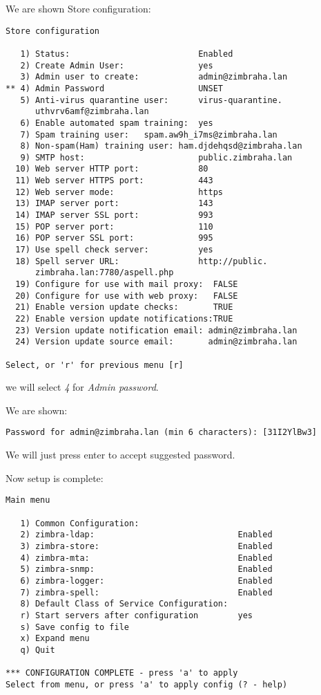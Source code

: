 We are shown Store configuration:
\begin{verbatim}
Store configuration

   1) Status:                          Enabled
   2) Create Admin User:               yes
   3) Admin user to create:            admin@zimbraha.lan
** 4) Admin Password                   UNSET
   5) Anti-virus quarantine user:      virus-quarantine.
      uthvrv6amf@zimbraha.lan
   6) Enable automated spam training:  yes 
   7) Spam training user:   spam.aw9h_i7ms@zimbraha.lan
   8) Non-spam(Ham) training user: ham.djdehqsd@zimbraha.lan
   9) SMTP host:                       public.zimbraha.lan
  10) Web server HTTP port:            80
  11) Web server HTTPS port:           443
  12) Web server mode:                 https
  13) IMAP server port:                143
  14) IMAP server SSL port:            993
  15) POP server port:                 110
  16) POP server SSL port:             995
  17) Use spell check server:          yes
  18) Spell server URL:                http://public.
      zimbraha.lan:7780/aspell.php
  19) Configure for use with mail proxy:  FALSE
  20) Configure for use with web proxy:   FALSE
  21) Enable version update checks:       TRUE
  22) Enable version update notifications:TRUE
  23) Version update notification email: admin@zimbraha.lan
  24) Version update source email:       admin@zimbraha.lan

Select, or 'r' for previous menu [r]
\end{verbatim}
we will select \textit{4} for \textit{Admin password}.

We are shown:
\begin{verbatim}
Password for admin@zimbraha.lan (min 6 characters): [31I2YlBw3]
\end{verbatim}

We will just press enter to accept suggested password.

Now setup is complete:
\begin{verbatim}
Main menu

   1) Common Configuration:                                                  
   2) zimbra-ldap:                             Enabled                       
   3) zimbra-store:                            Enabled                       
   4) zimbra-mta:                              Enabled                       
   5) zimbra-snmp:                             Enabled                       
   6) zimbra-logger:                           Enabled                       
   7) zimbra-spell:                            Enabled                       
   8) Default Class of Service Configuration:                                
   r) Start servers after configuration        yes                           
   s) Save config to file                                                    
   x) Expand menu                                                            
   q) Quit                                    

*** CONFIGURATION COMPLETE - press 'a' to apply
Select from menu, or press 'a' to apply config (? - help) 

\end{verbatim}


